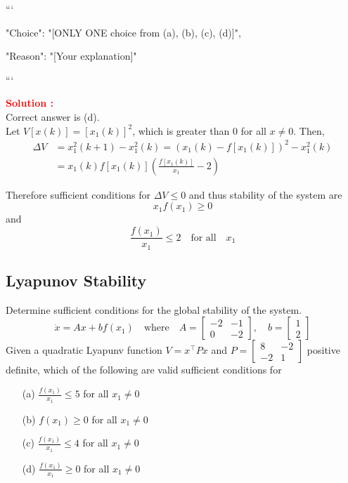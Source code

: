 \documentclass[12pt]{article}
\begin{document}
```
{

"Choice": "[ONLY ONE choice from (a), (b), (c), (d)]",

"Reason": "[Your explanation]"

}

```


\textbf{\textcolor{red}{Solution :}} \\
Correct answer is (d).\\
Let \(V[x(k)] = [x_1(k)]^2\), which is greater than \(0\) for all \(x \neq 0\). Then, 
\begin{align}
    \Delta V &= x_1^2(k+1) - x_1^2(k) = (x_1(k)-f[x_1(k)])^2 -x_1^2(k) \\
        & = x_1(k)f[x_1(k)]\left( \frac{f[x_1(k)]}{x_1}-2\right)
\end{align}

Therefore sufficient conditions for \(\Delta V \leq 0\) and thus stability of the system are
\[ x_1f(x_1) \geq 0 \]
and
\[ \frac{f(x_1)}{x_1} \leq 2 \quad \text{for all} \quad x_1\]
\clearpage

\subsection{Lyapunov Stability}

Determine sufficient conditions for the global stability of the system. 
\begin{equation}
    \dot{x} = Ax + bf(x_1) \quad \text{where} \quad A = \begin{bmatrix}
        -2 & -1 \\ 0 & -2
    \end{bmatrix}, \quad b = \begin{bmatrix}
        1 \\ 2
    \end{bmatrix}
\end{equation}
Given a quadratic Lyapunv function $V = x^\top P x$ and $P=\begin{bmatrix}
    8 & -2\\
    -2 & 1
\end{bmatrix}$ positive definite, which of the following are valid sufficient conditions for 
\begin{itemize}
    \item[(a)] \(\frac{f(x_1)}{x_1}\leq 5\) for all $x_1 \neq 0$
    \item[(b)] \(f(x_1)\geq 0\) for all $x_1 \neq 0$
    \item[(c)] \(\frac{f(x_1)}{x_1}\leq 4\) for all $x_1 \neq 0$
    \item[(d)] \(\frac{f(x_1)}{x_1}\geq 0\) for all $x_1 \neq 0$
\end{itemize}
\end{document}
